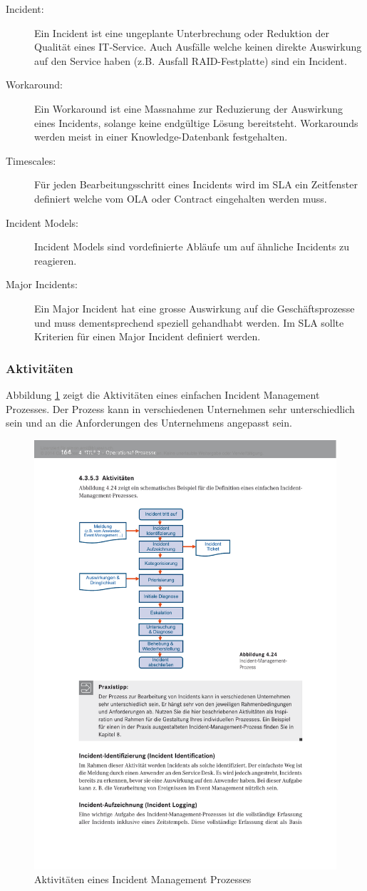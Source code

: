 \begin{description}
	\item[Incident:] Ein Incident ist eine ungeplante Unterbrechung oder Reduktion der Qualität eines IT-Service. Auch Ausfälle welche keinen direkte Auswirkung auf den Service haben (z.B. Ausfall RAID-Festplatte) sind ein Incident.
	\item[Workaround:] Ein Workaround ist eine Massnahme zur Reduzierung der Auswirkung eines Incidents, solange keine endgültige Lösung bereitsteht. Workarounds werden meist in einer Knowledge-Datenbank festgehalten.
	\item[Timescales:] Für jeden Bearbeitungsschritt eines Incidents wird im SLA ein Zeitfenster definiert welche vom OLA oder Contract eingehalten werden muss.
	\item[Incident Models:] Incident Models sind vordefinierte Abläufe um auf ähnliche Incidents zu reagieren.
	\item[Major Incidents:] Ein Major Incident hat eine grosse Auswirkung auf die Geschäftsprozesse und muss dementsprechend speziell gehandhabt werden. Im SLA sollte Kriterien für einen Major Incident definiert werden.
\end{description}

\subsubsection{Aktivitäten}

Abbildung \ref{fig:ablauf-incident-management} zeigt die Aktivitäten eines einfachen Incident Management Prozesses. Der Prozess kann in verschiedenen Unternehmen sehr unterschiedlich sein und an die Anforderungen des Unternehmens angepasst sein.

\begin{figure}[h!]
\centering
\includegraphics[width=0.7\linewidth]{fig/ablauf-incident-management}
\caption{Aktivitäten eines Incident Management Prozesses}
\label{fig:ablauf-incident-management}
\end{figure}

